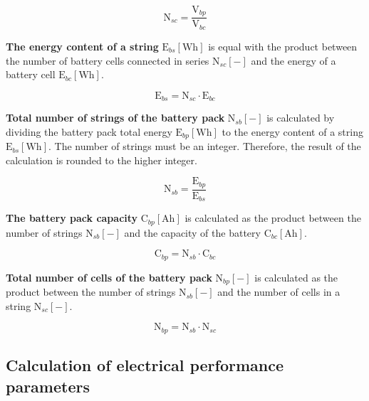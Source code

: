 \begin{equation}\label{eq:Ncs}
\text{N}_{sc} = \frac{\text{V}_{bp}}{\text{V}_{bc}}
\end{equation}

\textbf{The energy content of a string} $\text{E}_{bs} [\text{Wh}]$ is equal with the product between the number of battery cells connected in series $\text{N}_{sc} [-]$ and the energy of a battery cell $\text{E}_{bc} [\text{Wh}]$.

\begin{equation}\label{eq:Ebs}
\text{E}_{bs} = \text{N}_{sc} \cdot \text{E}_{bc}
\end{equation}

\textbf{Total number of strings of the battery pack} $\text{N}_{sb} [-]$ is calculated by dividing the battery pack total energy $\text{E}_{bp} [\text{Wh}]$ to the energy content of a string $\text{E}_{bs} [\text{Wh}]$. The number of strings must be an integer. Therefore, the result of the calculation is rounded to the higher integer.

\begin{equation}\label{eq:Nsb}
\text{N}_{sb} = \frac{\text{E}_{bp}}{\text{E}_{bs}}
\end{equation}


\textbf{The battery pack capacity} $\text{C}_{bp} [\text{Ah}]$ is calculated as the product between the number of strings $\text{N}_{sb} [-]$ and the capacity of the battery $\text{C}_{bc} [\text{Ah}]$.

\begin{equation}\label{eq:Cbp}
\text{C}_{bp} = \text{N}_{sb} \cdot\text{C}_{bc}
\end{equation}

\textbf{Total number of cells of the battery pack} $\text{N}_{bp} [-]$ is calculated as the product between the number of strings $\text{N}_{sb} [-]$ and the number of cells in a string $\text{N}_{sc} [-]$.

\begin{equation}\label{eq:Ncb}
\text{N}_{bp} = \text{N}_{sb} \cdot \text{N}_{sc}
\end{equation}

\subsection{Calculation of electrical performance parameters}

